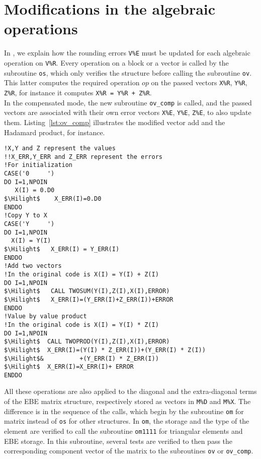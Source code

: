 \section{Modifications in the algebraic operations } 
\label{sec:imple_op}
%
In \cite{LaND16}, we explain how the 
rounding errors \texttt{V\%E} must be updated for each  
algebraic operation on \texttt{V\%R}.
Every operation on a block or a vector is called by 
the subroutine \texttt{os}, which only verifies the structure 
before calling the subroutine \texttt{ov}.
This latter computes the required operation $op$ 
on the passed vectors \texttt{X\%R}, \texttt{Y\%R}, \texttt{Z\%R},
for instance it computes \texttt{X\%R = Y\%R + Z\%R}.\\
%
In the compensated mode, the new subroutine 
\texttt{ov\_comp} is called, and the passed vectors 
are associated with their own error vectors
\texttt{X\%E}, \texttt{Y\%E}, \texttt{Z\%E}, to also update them.
Listing~\ref{lst:ov_comp} illustrates the modified vector add and 
the Hadamard product, for instance.
%
\begin{lstlisting}[language=TelFortran, caption={The algebraic operations in \texttt{ov\_comp} },label={lst:ov_comp},escapechar=\$]
!X,Y and Z represent the values
!!X_ERR,Y_ERR and Z_ERR represent the errors
!For initialization
CASE('0     ')
DO I=1,NPOIN
   X(I) = 0.D0
$\Hilight$    X_ERR(I)=0.D0
ENDDO
!Copy Y to X
CASE('Y     ')
DO I=1,NPOIN
  X(I) = Y(I)
$\Hilight$   X_ERR(I) = Y_ERR(I)
ENDDO
!Add two vectors
!In the original code is X(I) = Y(I) + Z(I) 
DO I=1,NPOIN
$\Hilight$   CALL TWOSUM(Y(I),Z(I),X(I),ERROR)
$\Hilight$   X_ERR(I)=(Y_ERR(I)+Z_ERR(I))+ERROR
ENDDO
!Value by value product
!In the original code is X(I) = Y(I) * Z(I) 
DO I=1,NPOIN
$\Hilight$  CALL TWOPROD(Y(I),Z(I),X(I),ERROR)
$\Hilight$  X_ERR(I)=(Y(I) * Z_ERR(I))+(Y_ERR(I) * Z(I))
$\Hilight$&          +(Y_ERR(I) * Z_ERR(I))
$\Hilight$  X_ERR(I)=X_ERR(I)+ ERROR
ENDDO
\end{lstlisting}
%
All these operations are also applied to the diagonal and 
the extra-diagonal terms of the EBE matrix structure,  
respectively stored as vectors in \texttt{M\%D} and \texttt{M\%X}.
The difference is in the sequence of the calls, which begin 
by the subroutine \texttt{om} for matrix instead of \texttt{os} 
for other structures.
In \texttt{om}, the storage and the type of the 
element are verified to call the subroutine \texttt{om1111}
for triangular elements and EBE storage.
In this subroutine, several tests are verified to then
pass the corresponding component vector of the matrix
to the subroutines \texttt{ov} or \texttt{ov\_comp}.

